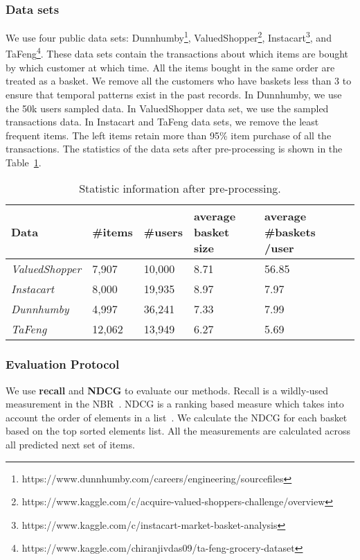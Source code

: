 \documentclass[sigconf]{acmart}
\begin{document}
\subsubsection{Data sets}
\label{sec:exp_data}
We use four public data sets: 
 Dunnhumby\footnote{https://www.dunnhumby.com/careers/engineering/sourcefiles}, ValuedShopper\footnote{https://www.kaggle.com/c/acquire-valued-shoppers-challenge/overview},  Instacart\footnote{https://www.kaggle.com/c/instacart-market-basket-analysis}, and TaFeng\footnote{https://www.kaggle.com/chiranjivdas09/ta-feng-grocery-dataset}. These data sets contain the  transactions about which items are bought by  which customer at which  time. All the items bought in the same order are treated as a basket.  We remove all the customers who have baskets  less than 3 to ensure that temporal  patterns exist in the past records. In Dunnhumby, we use the 50k users sampled data. In ValuedShopper data set, we use the sampled transactions data. In Instacart and TaFeng data sets, we remove the least frequent items. The left items retain more than 95\%  item purchase of all the transactions. The  statistics of the data sets after pre-processing is shown in the Table~\ref{tab:statistic}. 


\begin{table}[ht]
\small
\centering
\caption{Statistic information after pre-processing.}
\begin{tabularx}{\linewidth}{lXXXXX}
\toprule
Data &\#items &\#users &average basket size &average \#baskets /user\\
\midrule

\emph{ValuedShopper} &7,907  &10,000& 8.71& 56.85\\
\emph{Instacart} &8,000  &19,935 &8.97&7.97 \\
\emph{Dunnhumby} &4,997  &36,241 &7.33&7.99 \\
\emph{TaFeng}&12,062&13,949&6.27&5.69\\
\bottomrule
\end{tabularx}
\label{tab:statistic}
\end{table}




\subsubsection{Evaluation Protocol}

We use \textbf{recall} and \textbf{NDCG} to  evaluate our methods.
Recall is a wildly-used measurement in the  NBR~\cite{ying2018sequential}.
NDCG is a ranking based measure which takes into account the order of elements in a list~\cite{he2015trirank}. We calculate the NDCG for each basket  based on the top  sorted  elements list. All the measurements are calculated across all predicted next set of items. 
\end{document}
